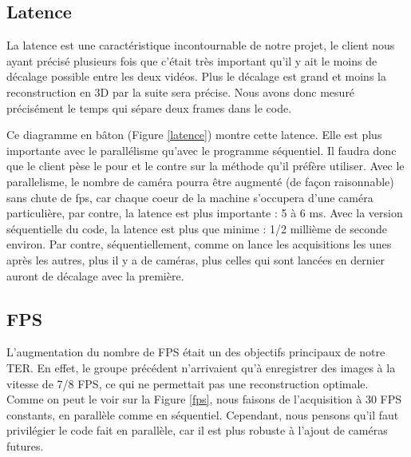 \subsection{Latence}

La latence est une caractéristique incontournable de notre projet, le client nous ayant précisé plusieurs fois que c'était très important qu'il y ait le moins de décalage possible entre les deux vidéos. Plus le décalage est grand et moins la reconstruction en 3D par la suite sera précise. Nous avons donc mesuré précisément le temps qui sépare deux frames dans le code. 

Ce diagramme en bâton (Figure \ref{latence}) montre cette latence. Elle est plus importante avec le parallélisme qu'avec le programme séquentiel. Il faudra donc que le client pèse le pour et le contre sur la méthode qu'il préfère utiliser. Avec le parallelisme, le nombre de caméra pourra être augmenté (de façon raisonnable) sans chute de fps, car chaque coeur de la machine s'occupera d'une caméra particulière, par contre, la latence est plus importante : 5 à 6 ms. Avec la version séquentielle du code, la latence est plus que minime : 1/2 millième de seconde environ. Par contre, séquentiellement, comme on lance les acquisitions les unes après les autres, plus il y a de caméras, plus celles qui sont lancées en dernier auront de décalage avec la première.

\subsection{FPS}

L'augmentation du nombre de FPS était un des objectifs principaux de notre TER. En effet, le groupe précédent n'arrivaient qu'à enregistrer des images à la vitesse de 7/8 FPS, ce qui ne permettait pas une reconstruction optimale. Comme on peut le voir sur la Figure \ref{fps}, nous faisons de l'acquisition à 30 FPS constants, en parallèle comme en séquentiel. Cependant, nous pensons qu'il faut privilégier le code fait en parallèle, car il est plus robuste à l'ajout de caméras futures.

